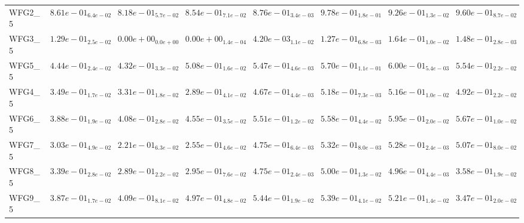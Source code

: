\documentclass{article}
\begin{document}
\begin{landscape}
\begin{table}
\begin{scriptsize}
\begin{tabular}{llllllll}
WFG2\_5 & $  8.61e-01_{ 6.4e-02}$ & $  8.18e-01_{ 5.7e-02}$ & $  8.54e-01_{ 7.1e-02}$ & $  8.76e-01_{ 3.4e-03}$ & \cellcolor{gray95}$  9.78e-01_{ 1.8e-01}$ & $  9.26e-01_{ 1.3e-02}$ & \cellcolor{gray25}$  9.60e-01_{ 8.7e-02}$ \\
WFG3\_5 & $  1.29e-01_{ 2.5e-02}$ & $  0.00e+00_{ 0.0e+00}$ & $  0.00e+00_{ 1.4e-04}$ & $  4.20e-03_{ 1.1e-02}$ & $  1.27e-01_{ 6.8e-03}$ & \cellcolor{gray95}$  1.64e-01_{ 1.0e-02}$ & \cellcolor{gray25}$  1.48e-01_{ 2.8e-03}$ \\
WFG5\_5 & $  4.44e-01_{ 2.4e-02}$ & $  4.32e-01_{ 3.3e-02}$ & $  5.08e-01_{ 1.6e-02}$ & $  5.47e-01_{ 4.6e-03}$ & \cellcolor{gray25}$  5.70e-01_{ 1.1e-01}$ & \cellcolor{gray95}$  6.00e-01_{ 5.4e-03}$ & $  5.54e-01_{ 2.2e-02}$ \\
WFG4\_5 & $  3.49e-01_{ 1.7e-02}$ & $  3.31e-01_{ 1.8e-02}$ & $  2.89e-01_{ 4.1e-02}$ & $  4.67e-01_{ 4.4e-03}$ & \cellcolor{gray95}$  5.18e-01_{ 7.3e-03}$ & \cellcolor{gray25}$  5.16e-01_{ 1.0e-02}$ & $  4.92e-01_{ 2.2e-02}$ \\
WFG6\_5 & $  3.88e-01_{ 1.9e-02}$ & $  4.08e-01_{ 2.8e-02}$ & $  4.55e-01_{ 3.5e-02}$ & $  5.51e-01_{ 1.2e-02}$ & $  5.58e-01_{ 4.4e-02}$ & \cellcolor{gray95}$  5.95e-01_{ 2.0e-02}$ & \cellcolor{gray25}$  5.67e-01_{ 1.0e-02}$ \\
WFG7\_5 & $  3.03e-01_{ 4.9e-02}$ & $  2.21e-01_{ 6.3e-02}$ & $  2.55e-01_{ 4.6e-02}$ & $  4.75e-01_{ 6.4e-03}$ & \cellcolor{gray95}$  5.32e-01_{ 8.0e-03}$ & \cellcolor{gray25}$  5.28e-01_{ 2.4e-03}$ & $  5.07e-01_{ 8.0e-02}$ \\
WFG8\_5 & $  3.39e-01_{ 2.8e-02}$ & $  2.89e-01_{ 2.2e-02}$ & $  2.95e-01_{ 7.6e-02}$ & $  4.75e-01_{ 2.4e-03}$ & \cellcolor{gray95}$  5.00e-01_{ 1.3e-02}$ & \cellcolor{gray25}$  4.96e-01_{ 4.4e-03}$ & $  3.58e-01_{ 1.9e-02}$ \\
WFG9\_5 & $  3.87e-01_{ 1.7e-02}$ & $  4.09e-01_{ 8.1e-02}$ & $  4.97e-01_{ 4.8e-02}$ & \cellcolor{gray95}$  5.44e-01_{ 1.9e-02}$ & \cellcolor{gray25}$  5.39e-01_{ 4.1e-02}$ & $  5.21e-01_{ 1.4e-02}$ & $  3.47e-01_{ 2.0e-02}$ \\
\hline
\end{tabular}
\end{scriptsize}
\end{table}
\end{landscape}
\end{document}
